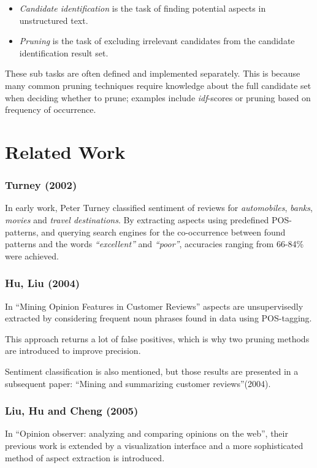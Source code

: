 \documentclass[a4paper,11pt]{kth-mag}
\begin{document}
\begin{itemize}
\item \emph{Candidate identification} is the task of finding potential aspects in unstructured text.

\item \emph{Pruning} is the task of excluding irrelevant candidates from the candidate
identification result set.

\end{itemize}

These sub tasks are often defined and implemented separately. This is because many common pruning
techniques require knowledge about the full candidate set when deciding whether to prune; examples include \emph{idf}-scores or pruning based on frequency of occurrence.


\section{Related Work}

\subsubsection{Turney (2002)}
In early work, Peter Turney classified sentiment of reviews for \emph{automobiles}, \emph{banks}, \emph{movies} and \emph{travel destinations}. By extracting aspects using predefined POS-patterns, and querying search engines for the co-occurrence between found patterns and the words \emph{``excellent''} and \emph{``poor''}, accuracies ranging from 66-84\% were achieved.

\subsubsection{Hu, Liu (2004)}
In ``Mining Opinion Features in Customer Reviews'' aspects are unsupervisedly
extracted by considering frequent noun phrases found in data using POS-tagging.

This approach returns a lot of false positives, which is why two pruning
methods are introduced to improve precision.

Sentiment classification is also mentioned, but those results are presented in a subsequent paper:
``Mining and summarizing customer reviews''(2004).


\subsubsection{Liu, Hu and Cheng (2005)}
In ``Opinion observer: analyzing and comparing opinions on the web'', their previous work is extended
by a visualization interface and a more sophisticated method of aspect extraction is introduced.
\end{document}
